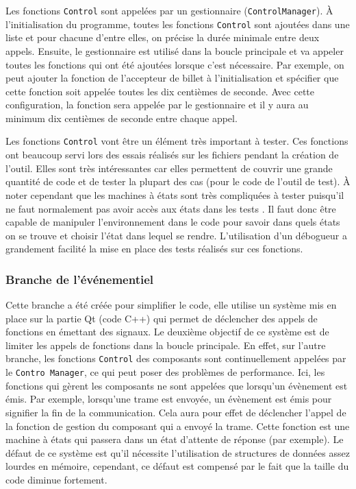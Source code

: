 \documentclass[a4paper]{article}
\begin{document}
Les fonctions \verb|Control| sont appelées par un gestionnaire
(\verb|ControlManager|). À l'initialisation du programme, toutes les fonctions
\verb|Control| sont ajoutées dans une liste et pour chacune d'entre elles, on
précise la durée minimale entre deux appels. Ensuite, le gestionnaire est
utilisé dans la boucle principale et va appeler toutes les fonctions qui ont été
ajoutées lorsque c'est nécessaire. Par exemple, on peut ajouter la fonction de
l'accepteur de billet à l'initialisation et spécifier que cette fonction soit
appelée toutes les dix centièmes de seconde. Avec cette configuration, la
fonction sera appelée par le gestionnaire et il y aura au minimum dix centièmes
de seconde entre chaque appel.

Les fonctions \verb|Control| vont être un élément très important à tester. Ces
fonctions ont beaucoup servi lors des essais réalisés sur les fichiers pendant la
création de l'outil. Elles sont très intéressantes car elles permettent de
couvrir une grande quantité de code et de tester la plupart des cas (pour le
code de l'outil de test). À noter cependant que les machines à états sont très
compliquées à tester puisqu'il ne faut normalement pas avoir accès aux états
dans les tests \cite{teststatemachines}. Il faut donc être capable de manipuler
l'environnement dans le code pour savoir dans quels états on se trouve et choisir
l'état dans lequel se rendre. L'utilisation d'un débogueur a grandement facilité
la mise en place des tests réalisés sur ces fonctions.

\subsubsection{Branche de l'événementiel}
\label{brancheevent}

Cette branche a été créée pour simplifier le code, elle utilise un système mis
en place sur la partie Qt (code C++) qui  permet de déclencher des appels de
fonctions en émettant des signaux. Le deuxième objectif de ce système est de
limiter les appels de fonctions dans la boucle principale. En effet, sur l'autre
branche, les fonctions \verb|Control| des composants sont continuellement
appelées par le \verb|Contro Manager|, ce qui peut poser des problèmes de
performance. Ici, les fonctions qui gèrent les composants ne sont appelées que
lorsqu'un évènement est émis. Par exemple, lorsqu'une trame est envoyée, un
évènement est émis pour signifier la fin de la communication. Cela aura pour
effet de déclencher l'appel de la fonction de gestion du composant qui a envoyé
la trame. Cette fonction est une machine à états qui passera dans un état
d'attente de réponse (par exemple). Le défaut de ce système est qu'il nécessite
l'utilisation de structures de données assez lourdes en mémoire, cependant, ce
défaut est compensé par le fait que la taille du code diminue fortement.
\end{document}

